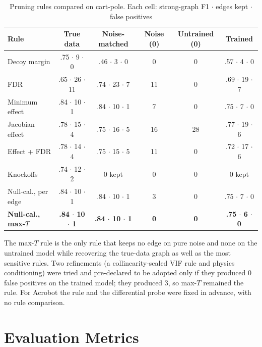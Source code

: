 \documentclass[11pt, a4paper, oneside,enumerate,textcomp]{report}
\begin{document}
\begin{table}[htbp]
\caption{Pruning rules compared on cart-pole. Each cell: strong-graph F1 $\cdot$ edges kept $\cdot$ false positives}
\centering
\footnotesize
\begin{tabular}{| p{3.2cm} | c | c | c | c | c |}
\hline
\textbf{Rule} & \textbf{True data} & \textbf{Noise-matched} & \textbf{Noise (0)} & \textbf{Untrained (0)} & \textbf{Trained} \\
\hline
Decoy margin & .75 $\cdot$ 9 $\cdot$ 0 & .46 $\cdot$ 3 $\cdot$ 0 & 0 & 0 & .57 $\cdot$ 4 $\cdot$ 0 \\
\hline
FDR & .65 $\cdot$ 26 $\cdot$ 11 & .74 $\cdot$ 23 $\cdot$ 7 & 11 & 0 & .69 $\cdot$ 19 $\cdot$ 7 \\
\hline
Minimum effect & .84 $\cdot$ 10 $\cdot$ 1 & .84 $\cdot$ 10 $\cdot$ 1 & 7 & 0 & .75 $\cdot$ 7 $\cdot$ 0 \\
\hline
Jacobian effect & .78 $\cdot$ 15 $\cdot$ 4 & .75 $\cdot$ 16 $\cdot$ 5 & 16 & 28 & .77 $\cdot$ 19 $\cdot$ 6 \\
\hline
Effect + FDR & .78 $\cdot$ 14 $\cdot$ 4 & .75 $\cdot$ 15 $\cdot$ 5 & 11 & 0 & .72 $\cdot$ 17 $\cdot$ 6 \\
\hline
Knockoffs & .74 $\cdot$ 12 $\cdot$ 2 & 0 kept & 0 & 0 & 0 kept \\
\hline
Null-cal., per edge & .84 $\cdot$ 10 $\cdot$ 1 & .84 $\cdot$ 10 $\cdot$ 1 & 3 & 0 & .75 $\cdot$ 7 $\cdot$ 0 \\
\hline
\textbf{Null-cal., max-$T$} & \textbf{.84 $\cdot$ 10 $\cdot$ 1} & \textbf{.84 $\cdot$ 10 $\cdot$ 1} & \textbf{0} & \textbf{0} & \textbf{.75 $\cdot$ 6 $\cdot$ 0} \\
\hline
\end{tabular}
\label{tab:pruning}
\end{table}

The max-$T$ rule is the only rule that keeps no edge on pure noise and none on the untrained model while recovering the true-data graph as well as the most sensitive rules. Two refinements (a collinearity-scaled VIF rule and physics conditioning) were tried and pre-declared to be adopted only if they produced 0 false positives on the trained model; they produced 3, so max-$T$ remained the rule. For Acrobot the rule and the differential probe were fixed in advance, with no rule comparison.

\section{Evaluation Metrics}
\end{document}
